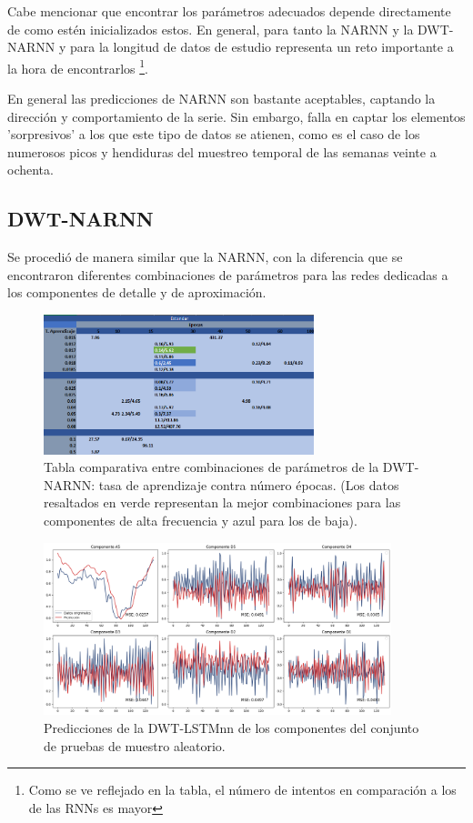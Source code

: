Cabe mencionar que encontrar los parámetros adecuados depende directamente de como estén inicializados estos. En general, para tanto la NARNN y la DWT-NARNN y para la longitud de datos de estudio representa un reto importante a la hora de encontrarlos \footnote{Como se ve reflejado en la tabla, el número de intentos en comparación a los de las RNNs es mayor}. 

En general las predicciones de NARNN son bastante aceptables, captando la dirección y comportamiento de la serie. Sin embargo, falla en captar los elementos 'sorpresivos' a los que este tipo de datos se atienen, como es el caso de los numerosos picos y hendiduras del muestreo temporal de las semanas veinte a ochenta.

\newpage

\subsection{DWT-NARNN}
Se procedió de manera similar que la NARNN, con la diferencia que se encontraron diferentes combinaciones de parámetros para las redes dedicadas a los componentes de detalle y de aproximación.

\begin{figure}[H]
    \centering
    \includegraphics[width=0.7\textwidth]{Figuras/proceso_de_entrenamiento/lr_epocas_DWT_NARNN_estandar.png}
    \caption{Tabla comparativa entre combinaciones de parámetros de la DWT-NARNN: tasa de aprendizaje contra número épocas. (Los datos resaltados en verde representan la mejor combinaciones para las componentes de alta frecuencia y azul para los de baja).} 
    \label{fig:lr_epocas_DWTNARNN}
\end{figure}

\begin{figure}[H]
    \centering
    \includegraphics[width=0.9\textwidth]{Figuras/proceso_de_entrenamiento/grafs_c_prueba/muestreo_aleatorio/DWT_NARNN/estandar/DWT_NARNN.png}
    \caption{Predicciones de la DWT-LSTMnn de los componentes del conjunto de pruebas de muestro aleatorio.} 
    \label{fig:c_prueba_componentes_DWT_NARNN_aleatorio}
\end{figure}

